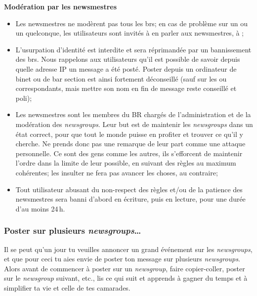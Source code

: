 \textbf{Modération par les newsmestres}
\begin{itemize}
 \item Les newsmestres ne modèrent pas tous les brs; en cas de problème sur un  ou un  quelconque, les utilisateurs sont invités à en parler aux newsmestres, à ;
 \item L'usurpation d'identité est interdite et sera réprimandée par un bannissement des brs. Nous rappelons aux utilisateurs qu'il est possible de savoir depuis quelle adresse IP un message a été posté. Poster depuis un ordinateur de binet ou de bar section est ainsi fortement déconseillé (sauf sur les  ou  correspondants, mais mettre son nom en fin de message reste conseillé et poli);
 \item Les newsmestres sont les membres du BR chargés de l'administration et de la modération des \emph{newsgroups}. Leur but est de maintenir les \emph{newsgroups} dans un état correct, pour que tout le monde puisse en profiter et trouver ce qu'il y cherche. Ne prends donc pas une remarque de leur part comme une attaque personnelle. Ce sont des gens comme les autres, ils s'efforcent de maintenir l'ordre dans la limite de leur possible, en suivant des règles au maximum cohérentes; les insulter ne fera pas avancer les choses, au contraire;
 \item Tout utilisateur abusant du non-respect des règles et/ou de la patience des newsmestres sera banni d'abord en écriture, puis en lecture, pour une durée d'au moins 24\,h.
\end{itemize}

\setcounter{page}{11}

\subsubsection{Poster sur plusieurs \emph{newsgroups}\dots }



Il se peut qu'un jour tu veuilles annoncer un grand événement sur les \emph{newsgroups}, et que pour ceci tu aies envie de poster ton message sur
plusieurs \emph{newsgroups}. Alors avant de commencer à poster sur un \emph{newsgroup}, faire copier-coller, poster sur le \emph{newsgroup} suivant,
etc., lis ce qui suit et apprends à gagner du temps et à simplifier ta vie et celle de tes camarades.

